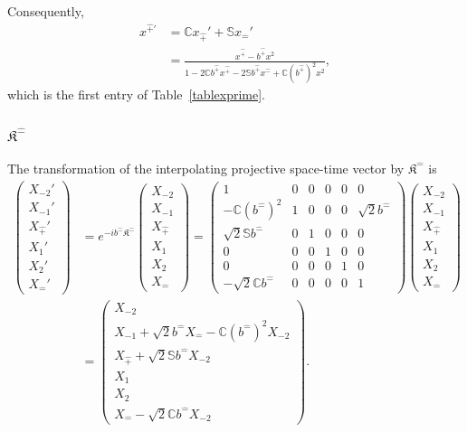 \documentclass[foundations,article,submit,pdftex,moreauthors]{Definitions/mdpi}
\begin{document}
Consequently,
\begin{align}
x^{\hat{+}\prime}
&=\mathbb{C}x_{\hat{+}}'+\mathbb{S}x_{\hat{-}}'\nonumber\\
&=\frac{x^{\hat{+}}-b^{\hat{+}}x^2}
{1-2\mathbb{C}b^{\hat{+}}x^{\hat{+}}
 -2\mathbb{S}b^{\hat{+}}x^{\hat{-}}
 +\mathbb{C}(b^{\hat{+}})^2x^2},
\end{align}
which is the first entry of Table~\ref{tablexprime}.

\subsubsection{\texorpdfstring{$\mathfrak{K}^{\hat{-}}$}{K hat minus}}

The transformation of the interpolating projective space-time vector by
$\mathfrak{K}^{\hat{-}}$ is
\begin{align}
\begin{pmatrix}
X_{-2}'\\ X_{-1}'\\ X_{\hat{+}}'\\ X_1'\\ X_2'\\ X_{\hat{-}}'
\end{pmatrix}
&=e^{-ib^{\hat{-}}\mathfrak{K}^{\hat{-}}}
\begin{pmatrix}
X_{-2}\\ X_{-1}\\ X_{\hat{+}}\\ X_1\\ X_2\\ X_{\hat{-}}
\end{pmatrix}
=\begin{pmatrix}
1 & 0 & 0 & 0 & 0 & 0\\
- \mathbb{C} (b^{\hat{-}})^{2} & 1 & 0 & 0 & 0 & \sqrt{2} b^{\hat{-}}\\
\sqrt{2} \mathbb{S} b^{\hat{-}} & 0 & 1 & 0 & 0 & 0\\
0 & 0 & 0 & 1 & 0 & 0\\
0 & 0 & 0 & 0 & 1 & 0\\
- \sqrt{2} \mathbb{C} b^{\hat{-}} & 0 & 0 & 0 & 0 & 1
\end{pmatrix}
\begin{pmatrix}
X_{-2}\\ X_{-1}\\ X_{\hat{+}}\\ X_1\\ X_2\\ X_{\hat{-}}
\end{pmatrix}\\
&=\begin{pmatrix}
X_{-2}\\
X_{-1}+\sqrt{2}b^{\hat{-}}X_{\hat{-}}
-\mathbb{C}(b^{\hat{-}})^2X_{-2}\\
X_{\hat{+}}+\sqrt{2}\mathbb{S}b^{\hat{-}}X_{-2}\\
X_1\\
X_2\\
X_{\hat{-}}-\sqrt{2}\mathbb{C}b^{\hat{-}}X_{-2}
\end{pmatrix}.
\end{align}
\end{document}
